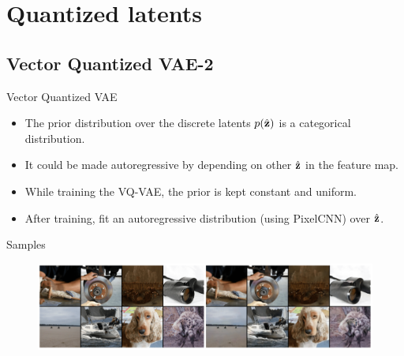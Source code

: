 \section{Quantized latents}
\subsection{Vector Quantized VAE-2}
\begin{frame}{Vector Quantized VAE}
	\begin{itemize}
		\item The prior distribution over the discrete latents $p(\hat{\mathbf{z}})$ is a categorical distribution.
		\item It could be made autoregressive by depending on other $\hat{\mathbf{z}}$ in the feature map. 
		\item While training the VQ-VAE, the prior is kept constant and uniform. 
		\item After training, fit an autoregressive distribution (using PixelCNN) over $\hat{\mathbf{z}}$.
	\end{itemize}
	\begin{block}{Samples}
		\begin{figure}
			\centering
			\includegraphics[width=\linewidth]{figs/vqvae_results}
		\end{figure}
	\end{block}

\end{frame}
